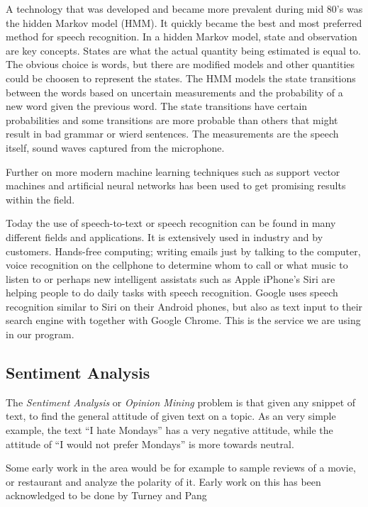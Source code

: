 \documentclass[a4paper,12pt,twoside]{ltxdoc}
\begin{document}
A technology that was developed and became more prevalent during mid 80's was the hidden Markov model (HMM). It quickly became the best and most preferred method for speech recognition. In a hidden Markov model, state and observation are key concepts. States are what the actual quantity being estimated is equal to. The obvious choice is words, but there are modified models and other quantities could be choosen to represent the states. The HMM models the state transitions between the words based on uncertain measurements and the probability of a new word given the previous word. The state transitions have certain probabilities and some transitions are more probable than others that might result in bad grammar or wierd sentences.  The measurements are the speech itself, sound waves captured from the microphone\cite{history}.

Further on more modern machine learning techniques such as support vector machines and artificial neural networks has been used to get promising results within the field.

Today the use of speech-to-text or speech recognition can be found in many different fields and applications. It is extensively used in industry and by customers. Hands-free computing; writing emails just by talking to the computer, voice recognition on the cellphone to determine whom to call or what music to listen to or perhaps new intelligent assistats such as Apple iPhone's Siri are helping people to do daily tasks with speech recognition. Google uses speech recognition similar to Siri on their Android phones, but also as text input to their search engine with together with Google Chrome. This is the service we are using in our program.



\subsection{Sentiment Analysis}
The \emph{Sentiment Analysis} or \emph{Opinion Mining} problem is that given any snippet of text, to find the general attitude of given text on a topic.
As an very simple example, the text ``I hate Mondays'' has a very negative attitude, while the attitude of ``I would not prefer Mondays'' is more towards neutral.

Some early work in the area would be for example to sample reviews of a movie, or restaurant and analyze the polarity of it. Early work on this has been acknowledged to be done by Turney\cite{turney} and Pang\cite{pang}
\end{document}
